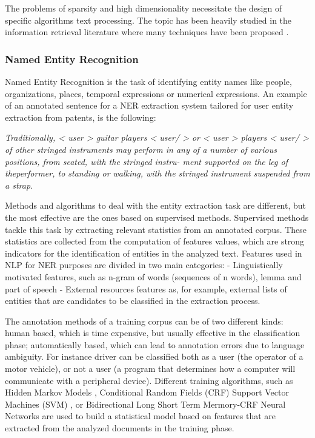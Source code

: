 \documentclass[]{book}
\begin{document}
The problems of sparsity and high dimensionality necessitate the design
of specific algorithms text processing. The topic has been heavily
studied in the information retrieval literature where many techniques
have been proposed \citep{ricardo2011modern}.

\subsubsection{Named Entity Recognition}\label{sotatoolsmodelner}

Named Entity Recognition is the task of identifying entity names like
people, organizations, places, temporal expressions or numerical
expressions. An example of an annotated sentence for a NER extraction
system tailored for user entity extraction from patents, is the
following:

\emph{Traditionally, \textless{} user \textgreater{} guitar players
\textless{} user/ \textgreater{} or \textless{} user \textgreater{}
players \textless{} user/ \textgreater{} of other stringed instruments
may perform in any of a number of various positions, from seated, with
the stringed instru- ment supported on the leg of theperformer, to
standing or walking, with the stringed instrument suspended from a
strap.}

Methods and algorithms to deal with the entity extraction task are
different, but the most effective are the ones based on supervised
methods. Supervised methods tackle this task by extracting relevant
statistics from an annotated corpus. These statistics are collected from
the computation of features values, which are strong indicators for the
identification of entities in the analyzed text. Features used in NLP
for NER purposes are divided in two main categories: - Linguistically
motivated features, such as n-gram of words (sequences of n words),
lemma and part of speech - External resources features as, for example,
external lists of entities that are candidates to be classified in the
extraction process.

The annotation methods of a training corpus can be of two different
kinds: human based, which is time expensive, but usually effective in
the classification phase; automatically based, which can lead to
annotation errors due to language ambiguity. For instance driver can be
classified both as a user (the operator of a motor vehicle), or not a
user (a program that determines how a computer will communicate with a
peripheral device). Different training algorithms, such as Hidden Markov
Models \citep{eddy1996hidden}, Conditional Random Fields (CRF)
\citep{lafferty2001conditional} Support Vector Machines (SVM)
\citep{hearst1998support}, or Bidirectional Long Short Term Mermory-CRF
Neural Networks \citep[\citet{misawa2017character}]{lample2016neural}
are used to build a statistical model based on features that are
extracted from the analyzed documents in the training phase.
\end{document}
